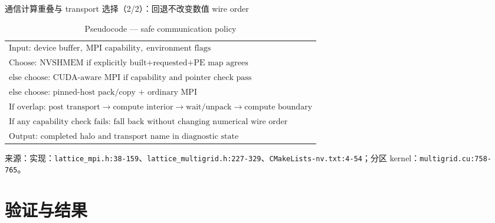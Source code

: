 \documentclass[UTF8,aspectratio=169,11pt]{ctexbeamer}
\newcommand{\source}[1]{%
  \vspace{0.06em}\par{\raggedright\scriptsize\color{muted}来源：#1\par}}
\newcommand{\code}[1]{\nolinkurl{#1}}
\begin{document}
\begin{frame}[t]{通信计算重叠与 transport 选择（2/2）：回退不改变数值 wire order}
  \begin{table}[htbp]
    \centering
    \caption*{Pseudocode — safe communication policy}
    \small
    \renewcommand{\arraystretch}{0.82}
    \begin{tabular}{@{}l@{}}
      $\text{Input: }\text{device buffer},\;\text{MPI capability},\;\text{environment flags}$ \\
      $\text{Choose: }\text{NVSHMEM if explicitly built+requested+PE map agrees}$ \\
      $\text{else choose: }\text{CUDA-aware MPI if capability and pointer check pass}$ \\
      $\text{else choose: }\text{pinned-host pack/copy + ordinary MPI}$ \\
      $\text{If overlap: }\text{post transport}\to\text{compute interior}\to\text{wait/unpack}\to\text{compute boundary}$ \\
      $\text{If any capability check fails: }\text{fall back without changing numerical wire order}$ \\
      $\text{Output: }\text{completed halo and transport name in diagnostic state}$
    \end{tabular}
  \end{table}
  \begin{center}\small
  \end{center}
  \source{实现：\code{lattice_mpi.h:38-159}、\code{lattice_multigrid.h:227-329}、\code{CMakeLists-nv.txt:4-54}；分区 kernel：\code{multigrid.cu:758-765}。}
\end{frame}

\section{验证与结果}
\end{document}
